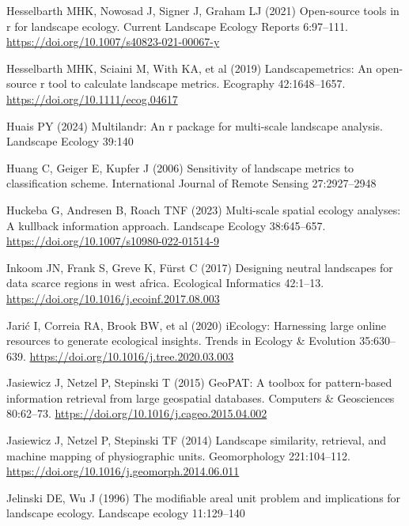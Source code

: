 \documentclass[
  10pt,
  a4paperpaper,
]{article}
\newlength{\cslhangindent}
\newenvironment{CSLReferences}[2] %
 {\begin{list}{}{%
  \setlength{\itemindent}{0pt}
  \setlength{\leftmargin}{0pt}
  \setlength{\parsep}{0pt}
  \ifodd #1
   \setlength{\leftmargin}{\cslhangindent}
   \setlength{\itemindent}{-1\cslhangindent}
  \fi
  \setlength{\itemsep}{#2\baselineskip}}}
 {\end{list}}
\begin{document}
\begin{CSLReferences}{1}{1}
Hesselbarth MHK, Nowosad J, Signer J, Graham LJ (2021) Open-source tools
in r for landscape ecology. Current Landscape Ecology Reports 6:97--111.
\url{https://doi.org/10.1007/s40823-021-00067-y}

Hesselbarth MHK, Sciaini M, With KA, et al (2019) Landscapemetrics: An
open-source r tool to calculate landscape metrics. Ecography
42:1648--1657. \url{https://doi.org/10.1111/ecog.04617}

Huais PY (2024) Multilandr: An r package for multi-scale landscape
analysis. Landscape Ecology 39:140

Huang C, Geiger E, Kupfer J (2006) Sensitivity of landscape metrics to
classification scheme. International Journal of Remote Sensing
27:2927--2948

Huckeba G, Andresen B, Roach TNF (2023) Multi-scale spatial ecology
analyses: A kullback information approach. Landscape Ecology
38:645--657. \url{https://doi.org/10.1007/s10980-022-01514-9}

Inkoom JN, Frank S, Greve K, Fürst C (2017) Designing neutral landscapes
for data scarce regions in west africa. Ecological Informatics 42:1--13.
\url{https://doi.org/10.1016/j.ecoinf.2017.08.003}

Jarić I, Correia RA, Brook BW, et al (2020) iEcology: Harnessing large
online resources to generate ecological insights. Trends in Ecology \&
Evolution 35:630--639. \url{https://doi.org/10.1016/j.tree.2020.03.003}

Jasiewicz J, Netzel P, Stepinski T (2015) GeoPAT: A toolbox for
pattern-based information retrieval from large geospatial databases.
Computers \& Geosciences 80:62--73.
\url{https://doi.org/10.1016/j.cageo.2015.04.002}

Jasiewicz J, Netzel P, Stepinski TF (2014) Landscape similarity,
retrieval, and machine mapping of physiographic units. Geomorphology
221:104--112. \url{https://doi.org/10.1016/j.geomorph.2014.06.011}

Jelinski DE, Wu J (1996) The modifiable areal unit problem and
implications for landscape ecology. Landscape ecology 11:129--140


\end{CSLReferences}
\end{document}

